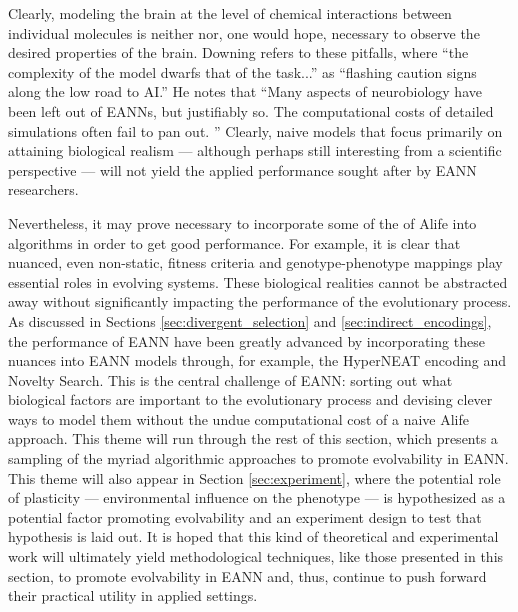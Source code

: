 Clearly, modeling the brain at the level of chemical interactions between individual molecules is neither nor, one would hope, necessary to observe the desired properties of the brain. Downing refers to these pitfalls, where ``the complexity of the model dwarfs that of the task...'' as ``flashing caution signs along the low road to AI.'' He notes that ``Many aspects of neurobiology have been left out of EANNs, but justifiably so. The computational costs of detailed simulations often fail to pan out. '' \cite[pg 354]{Downing2015IntelligenceSystems} Clearly, naive models that focus primarily on attaining biological realism --- although perhaps still interesting from a scientific perspective --- will not yield the applied performance sought after by EANN researchers.

Nevertheless, it may prove necessary to incorporate some of the of Alife into algorithms in order to get good performance. For example, it is clear that nuanced, even non-static, fitness criteria and genotype-phenotype mappings play essential roles in evolving systems. These biological realities cannot be abstracted away without significantly impacting the performance of the evolutionary process. As discussed in Sections \ref{sec:divergent_selection} and \ref{sec:indirect_encodings}, the performance of EANN have been greatly advanced by incorporating these nuances into EANN models through, for example, the HyperNEAT encoding and Novelty Search. This is the central challenge of EANN: sorting out what biological factors are important to the evolutionary process and devising clever ways to model them without the undue computational cost of a naive Alife approach. This theme will run through the rest of this section, which presents a sampling of the myriad algorithmic approaches to promote evolvability in EANN. This theme will also appear in Section \ref{sec:experiment}, where the potential role of plasticity --- environmental influence on the phenotype --- is hypothesized as a potential factor promoting evolvability and an experiment design to test that hypothesis is laid out. It is hoped that this kind of theoretical and experimental work will ultimately yield methodological techniques, like those presented in this section, to promote evolvability in EANN and, thus, continue to push forward their practical utility in applied settings. 


